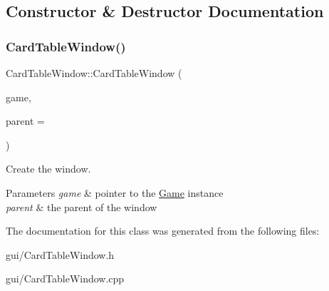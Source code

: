 \subsection{Constructor \& Destructor Documentation}
\mbox{\label{classCardTableWindow_a33e045d1c86fdf5ab05e3da2c5a575e1}} 
\subsubsection{\texorpdfstring{Card\+Table\+Window()}{CardTableWindow()}}
{\footnotesize\ttfamily Card\+Table\+Window\+::\+Card\+Table\+Window (\begin{DoxyParamCaption}\item[{\hyperlink{classGame}{Game} $\ast$}]{game,  }\item[{Q\+Widget $\ast$}]{parent = {} }\end{DoxyParamCaption})}



Create the window. 


\begin{DoxyParams}{Parameters}
{\em game} & pointer to the \hyperlink{classGame}{Game} instance \\
\hline
{\em parent} & the parent of the window \\
\hline
\end{DoxyParams}


The documentation for this class was generated from the following files\+:\begin{DoxyCompactItemize}
\item 
gui/Card\+Table\+Window.\+h\item 
gui/Card\+Table\+Window.\+cpp\end{DoxyCompactItemize}
